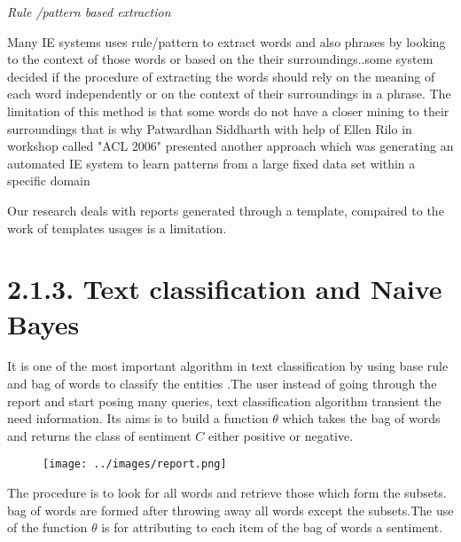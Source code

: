 \textit{Rule /pattern based extraction}

Many IE systems uses rule/pattern to extract words and also phrases by looking to the context of those words or based on the their surroundings.\citep{califf2003bottom}.some system decided if the procedure of extracting the words should rely on the meaning of each word independently or on the context of their surroundings in a phrase.
The limitation of this method is that some words do not have a closer mining to their surroundings that is why Patwardhan Siddharth with help of Ellen Rilo  in workshop called "ACL 2006" presented another approach which  was  generating an automated IE system to learn patterns from a large fixed data set  within a specific domain \citep{patwardhan2007effective} 

Our research deals with reports generated through a template, compaired to the work of  \citep{patwardhan2007effective} templates usages is a limitation.





\section*{2.1.3. Text classification and Naive Bayes}
It is one of the most important algorithm in text classification by using base rule and bag of words to classify the entities \citep{manning2012information}.The user instead of going through the report and start posing many queries, text classification algorithm transient the need information.
Its aims is to build a function $\theta$ which takes the bag of words and returns the class of sentiment $C$ either positive or negative.

{ \centering{$\theta$}

\centering{$\Updownarrow$}   

\begin{figure}[hbtp]
\centering
\texttt{[image: ../images/report.png]}
\end{figure}

{\centering{$\Updownarrow$}}

{}

The procedure is to look for all words and retrieve those which form the subsets.  bag of words are formed after throwing away  all words except the subsets.The use of the function $\theta$  is for  attributing  to each item of the bag of words a sentiment.}

